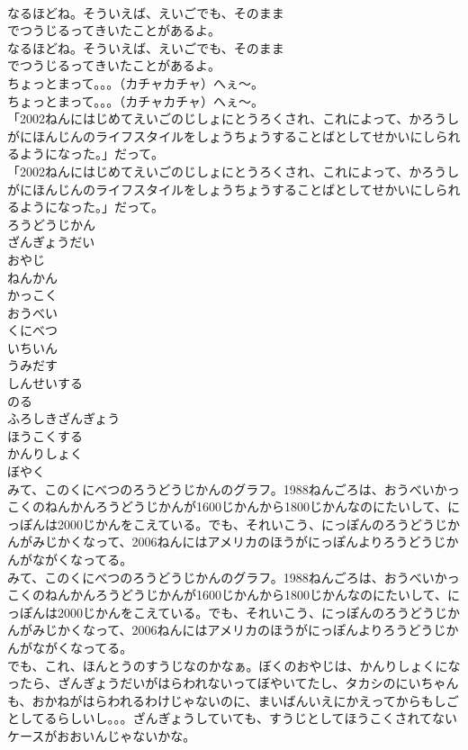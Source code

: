 \documentclass[8pt]{extreport}
\begin{document}
\begin{CJK}{UTF8}{min}
\\	なるほどね。そういえば、えいごでも、そのまま 
\\	でつうじるってきいたことがあるよ。
\\	なるほどね。そういえば、えいごでも、そのまま 
\\	でつうじるってきいたことがあるよ。
\\	ちょっとまって。。。（カチャカチャ）へぇ～。
\\	ちょっとまって。。。（カチャカチャ）へぇ～。
\\	「2002ねんにはじめてえいごのじしょにとうろくされ、これによって、かろうしがにほんじんのライフスタイルをしょうちょうすることばとしてせかいにしられるようになった。」だって。
\\	「2002ねんにはじめてえいごのじしょにとうろくされ、これによって、かろうしがにほんじんのライフスタイルをしょうちょうすることばとしてせかいにしられるようになった。」だって。
\\	ろうどうじかん
\\	ざんぎょうだい
\\	おやじ
\\	ねんかん
\\	かっこく
\\	おうべい
\\	くにべつ
\\	いちいん
\\	うみだす
\\	しんせいする
\\	のる
\\	ふろしきざんぎょう
\\	ほうこくする
\\	かんりしょく
\\	ぼやく
\\	みて、このくにべつのろうどうじかんのグラフ。1988ねんごろは、おうべいかっこくのねんかんろうどうじかんが1600じかんから1800じかんなのにたいして、にっぽんは2000じかんをこえている。でも、それいこう、にっぽんのろうどうじかんがみじかくなって、2006ねんにはアメリカのほうがにっぽんよりろうどうじかんがながくなってる。
\\	みて、このくにべつのろうどうじかんのグラフ。1988ねんごろは、おうべいかっこくのねんかんろうどうじかんが1600じかんから1800じかんなのにたいして、にっぽんは2000じかんをこえている。でも、それいこう、にっぽんのろうどうじかんがみじかくなって、2006ねんにはアメリカのほうがにっぽんよりろうどうじかんがながくなってる。
\\	でも、これ、ほんとうのすうじなのかなぁ。ぼくのおやじは、かんりしょくになったら、ざんぎょうだいがはらわれないってぼやいてたし、タカシのにいちゃんも、おかねがはらわれるわけじゃないのに、まいばんいえにかえってからもしごとしてるらしいし。。。ざんぎょうしていても、すうじとしてほうこくされてないケースがおおいんじゃないかな。

\end{CJK}
\end{document}
